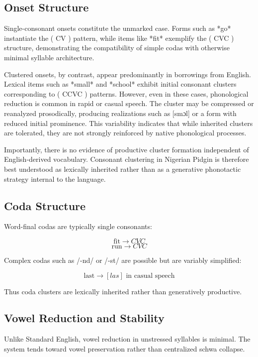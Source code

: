 \documentclass[12pt]{article}
\begin{document}
\subsection{Onset Structure}

Single-consonant onsets constitute the unmarked case. Forms such as *go* instantiate the ( CV ) pattern, while items like *fit* exemplify the ( CVC ) structure, demonstrating the compatibility of simple codas with otherwise minimal syllable architecture.

Clustered onsets, by contrast, appear predominantly in borrowings from English. Lexical items such as *small* and *school* exhibit initial consonant clusters corresponding to ( CCVC ) patterns. However, even in these cases, phonological reduction is common in rapid or casual speech. The cluster may be compressed or reanalyzed prosodically, producing realizations such as [smɔl] or a form with reduced initial prominence. This variability indicates that while inherited clusters are tolerated, they are not strongly reinforced by native phonological processes.

Importantly, there is no evidence of productive cluster formation independent of English-derived vocabulary. Consonant clustering in Nigerian Pidgin is therefore best understood as lexically inherited rather than as a generative phonotactic strategy internal to the language.

\subsection{Coda Structure}

Word-final codas are typically single consonants:

\[
\text{fit} \rightarrow CVC
\]
\[
\text{run} \rightarrow CVC
\]

Complex codas such as /-nd/ or /-st/ are possible but are variably simplified:

\[
\text{last} \rightarrow [las] \text{ in casual speech}
\]

Thus coda clusters are lexically inherited rather than generatively productive.

\subsection{Vowel Reduction and Stability}

Unlike Standard English, vowel reduction in unstressed syllables is minimal. The system tends toward vowel preservation rather than centralized schwa collapse.
\end{document}
